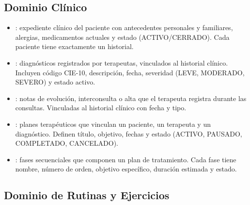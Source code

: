 \subsection{Dominio Clínico}

\begin{itemize}
  \item {}: expediente clínico del paciente con antecedentes personales y familiares, alergias, medicamentos actuales y estado (ACTIVO/CERRADO). Cada paciente tiene exactamente un historial.

  \item {}: diagnósticos registrados por terapeutas, vinculados al historial clínico. Incluyen código CIE-10, descripción, fecha, severidad (LEVE, MODERADO, SEVERO) y estado activo.

  \item {}: notas de evolución, interconsulta o alta que el terapeuta registra durante las consultas. Vinculadas al historial clínico con fecha y tipo.

  \item {}: planes terapéuticos que vinculan un paciente, un terapeuta y un diagnóstico. Definen título, objetivo, fechas y estado (ACTIVO, PAUSADO, COMPLETADO, CANCELADO).

  \item {}: fases secuenciales que componen un plan de tratamiento. Cada fase tiene nombre, número de orden, objetivo específico, duración estimada y estado.
\end{itemize}

\subsection{Dominio de Rutinas y Ejercicios}

